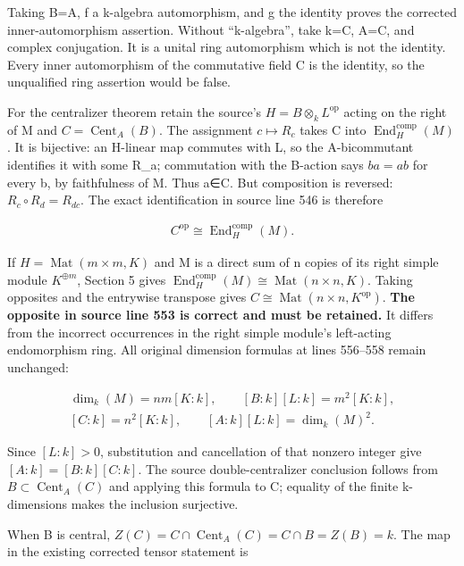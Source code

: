 \documentclass[11pt]{article}
\begin{document}
Taking B=A, f a k-algebra automorphism, and g the identity proves the corrected inner-automorphism assertion. Without ``k-algebra'', take k=C, A=C, and complex conjugation. It is a unital ring automorphism which is not the identity. Every inner automorphism of the commutative field C is the identity, so the unqualified ring assertion would be false.

For the centralizer theorem retain the source's \(H=B\otimes _{k} L^{\mathrm{op}}\) acting on the right of M and \(C=\operatorname{Cent}_{A}(B)\). The assignment \(c\mapsto R_{c}\) takes C into \(\operatorname{End}_{H}^{\mathrm{comp}}(M)\). It is bijective: an H-linear map commutes with L, so the A-bicommutant identifies it with some R\_a; commutation with the B-action says \(ba=ab\) for every b, by faithfulness of M. Thus a∈C. But composition is reversed: \(R_{c}\circ R_{d}=R_{dc}\). The exact identification in source line 546 is therefore

\[\begin{gathered}
C^{\mathrm{op}} \cong \operatorname{End}_{H}^{\mathrm{comp}}(M).
\end{gathered}\]

If \(H=\operatorname{Mat}(m\times m,K)\) and M is a direct sum of n copies of its right simple module \(K^{\oplus m}\), Section 5 gives \(\operatorname{End}_{H}^{\mathrm{comp}}(M)\cong \operatorname{Mat}(n\times n,K)\). Taking opposites and the entrywise transpose gives \(C\cong \operatorname{Mat}(n\times n,K^{\mathrm{op}})\). \textbf{The opposite in source line 553 is correct and must be retained.} It differs from the incorrect occurrences in the right simple module's left-acting endomorphism ring. All original dimension formulas at lines 556--558 remain unchanged:

\[\begin{gathered}
\operatorname{dim}_{k}(M)=nm[K:k],\qquad [B:k][L:k]=m^{2}[K:k],\\{}[C:k]=n^{2}[K:k],\qquad [A:k][L:k]=\operatorname{dim}_{k}(M)^{2}.
\end{gathered}\]

Since \([L:k]>0\), substitution and cancellation of that nonzero integer give \([A:k]=[B:k][C:k]\). The source double-centralizer conclusion follows from \(B\subset \operatorname{Cent}_{A}(C)\) and applying this formula to C; equality of the finite k-dimensions makes the inclusion surjective.

When B is central, \(Z(C)=C\cap \operatorname{Cent}_{A}(C)=C\cap B=Z(B)=k\). The map in the existing corrected tensor statement is
\end{document}
